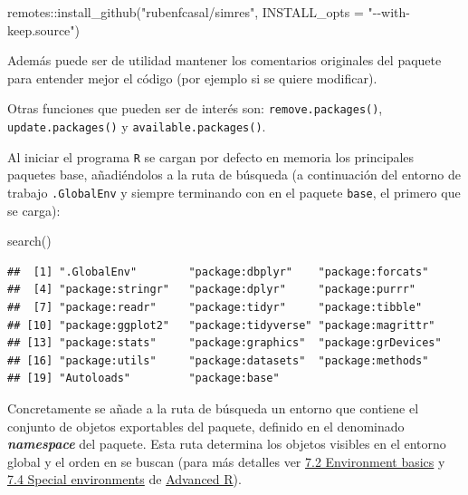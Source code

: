 \documentclass[
]{book}
\newenvironment{Shaded}{\begin{snugshade}}{\end{snugshade}}
\newcommand{\AttributeTok}[1]{\textcolor[rgb]{0.77,0.63,0.00}{#1}}
\newcommand{\FunctionTok}[1]{\textcolor[rgb]{0.00,0.00,0.00}{#1}}
\newcommand{\NormalTok}[1]{#1}
\newcommand{\SpecialCharTok}[1]{\textcolor[rgb]{0.00,0.00,0.00}{#1}}
\newcommand{\StringTok}[1]{\textcolor[rgb]{0.31,0.60,0.02}{#1}}
\theoremstyle{break}
\theoremstyle{nonumberplain}
\begin{document}
\begin{Shaded}
\begin{Highlighting}[]
\NormalTok{remotes}\SpecialCharTok{::}\FunctionTok{install\_github}\NormalTok{(}\StringTok{"rubenfcasal/simres"}\NormalTok{, }\AttributeTok{INSTALL\_opts =} \StringTok{"{-}{-}with{-}keep.source"}\NormalTok{)}
\end{Highlighting}
\end{Shaded}

Además puede ser de utilidad mantener los comentarios originales del paquete para entender mejor el código (por ejemplo si se quiere modificar).

Otras funciones que pueden ser de interés son: \texttt{remove.packages()}, \texttt{update.packages()} y \texttt{available.packages()}.

Al iniciar el programa \texttt{R} se cargan por defecto en memoria los principales paquetes base, añadiéndolos a la ruta de búsqueda (a continuación del entorno de trabajo \texttt{.GlobalEnv} y siempre terminando con en el paquete \texttt{base}, el primero que se carga):

\begin{Shaded}
\begin{Highlighting}[]
\FunctionTok{search}\NormalTok{()}
\end{Highlighting}
\end{Shaded}

\begin{verbatim}
##  [1] ".GlobalEnv"        "package:dbplyr"    "package:forcats"  
##  [4] "package:stringr"   "package:dplyr"     "package:purrr"    
##  [7] "package:readr"     "package:tidyr"     "package:tibble"   
## [10] "package:ggplot2"   "package:tidyverse" "package:magrittr" 
## [13] "package:stats"     "package:graphics"  "package:grDevices"
## [16] "package:utils"     "package:datasets"  "package:methods"  
## [19] "Autoloads"         "package:base"
\end{verbatim}

Concretamente se añade a la ruta de búsqueda un entorno que contiene el conjunto de objetos exportables del paquete, definido en el denominado \textbf{\emph{namespace}} del paquete.
Esta ruta determina los objetos visibles en el entorno global y el orden en se buscan (para más detalles ver \href{https://adv-r.hadley.nz/environments.html\#env-basics}{7.2 Environment basics} y \href{https://adv-r.hadley.nz/environments.html\#special-environments}{7.4 Special environments} de \href{https://adv-r.hadley.nz/index.html}{Advanced R}).
\end{document}
